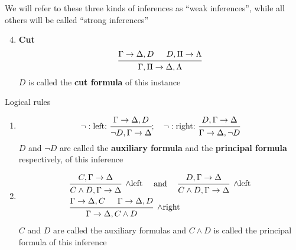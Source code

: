 \documentclass[11pt]{article}
\begin{document}
\begin{definition}[]
We will refer to these three kinds of inferences as ``weak inferences'',
while all others will be called ``strong inferences''
\begin{enumerate}
\setcounter{enumi}{3}
\item \textbf{Cut}
\begin{equation*}
\begin{prooftree}[center=false]
\hypo{\Gamma\to\Delta,D}
\hypo{D,\Pi \to\Lambda}
\infer2{\Gamma,\Pi\to\Delta,\Lambda}
\end{prooftree}
\end{equation*}
\(D\) is called the \textbf{cut formula} of this instance
\end{enumerate}


Logical rules
\begin{enumerate}
\item \begin{equation*}
\neg:\text{left: }
\begin{prooftree}
\hypo{\Gamma\to\Delta,D}
\infer1{\neg D,\Gamma\to\Delta}
\end{prooftree};\quad
\neg:\text{right: }
\begin{prooftree} 
\hypo{D,\Gamma\to\Delta}
\infer1{\Gamma\to\Delta,\neg D}
\end{prooftree}
\end{equation*}
\(D\) and \(\neg D\) are called the \textbf{auxiliary formula} and the \textbf{principal
formula} respectively, of this inference
\item \begin{align*}
&
\begin{prooftree}
\hypo{C,\Gamma\to\Delta}
\infer1[\(\wedge\)left]{C\wedge D,\Gamma\to\Delta}
\end{prooftree}\quad\text{ and }\quad
\begin{prooftree}
\hypo{D,\Gamma\to\Delta}
\infer1[\(\wedge\)left]{C\wedge D,\Gamma\to\Delta}
\end{prooftree}\\
&
\begin{prooftree}[center=false]
\hypo{\Gamma\to\Delta,C}
\hypo{\Gamma\to\Delta,D}
\infer2[\(\wedge\)right]{\Gamma\to\Delta,C\wedge D}
\end{prooftree}
\end{align*}
\(C\) and \(D\) are called the auxiliary formulas and \(C\wedge D\) is
called the principal formula of this inference


\end{enumerate}
\end{definition}
\end{document}

